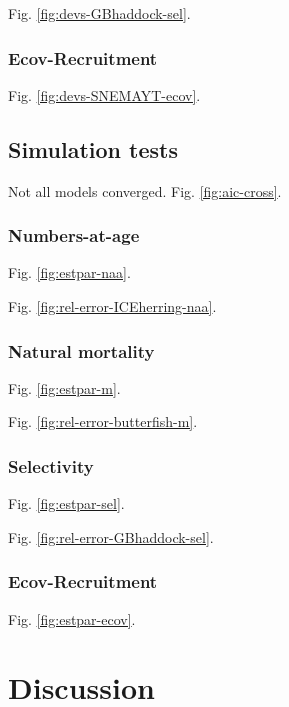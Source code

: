 \documentclass[]{article}
\begin{document}
Fig. \ref{fig:devs-GBhaddock-sel}.

\hypertarget{ecov-recruitment}{%
\subsubsection{Ecov-Recruitment}\label{ecov-recruitment}}

Fig. \ref{fig:devs-SNEMAYT-ecov}.

\hypertarget{simulation-tests-1}{%
\subsection{Simulation tests}\label{simulation-tests-1}}

Not all models converged. Fig. \ref{fig:aic-cross}.

\hypertarget{numbers-at-age-1}{%
\subsubsection{Numbers-at-age}\label{numbers-at-age-1}}

Fig. \ref{fig:estpar-naa}.

Fig. \ref{fig:rel-error-ICEherring-naa}.

\hypertarget{natural-mortality-1}{%
\subsubsection{Natural mortality}\label{natural-mortality-1}}

Fig. \ref{fig:estpar-m}.

Fig. \ref{fig:rel-error-butterfish-m}.

\hypertarget{selectivity-1}{%
\subsubsection{Selectivity}\label{selectivity-1}}

Fig. \ref{fig:estpar-sel}.

Fig. \ref{fig:rel-error-GBhaddock-sel}.

\hypertarget{ecov-recruitment-1}{%
\subsubsection{Ecov-Recruitment}\label{ecov-recruitment-1}}

Fig. \ref{fig:estpar-ecov}.

\hypertarget{discussion}{%
\section{Discussion}\label{discussion}}
\end{document}
